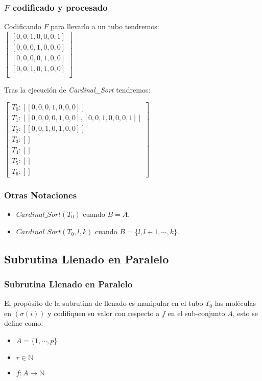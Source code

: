 \documentclass[12pt]{beamer}
\begin{document}
 \begin{frame}
     \frametitle{$F$ codificado y procesado}
     Codificando $F$ para llevarlo a un tubo tendremos: \\
    $
        \begin{bmatrix}
            [0, 0, 1, 0, 0, 0, 1] \\
            [0, 0, 0, 1, 0, 0, 0] \\
            [0, 0, 0, 0, 1, 0, 0] \\
            [0, 0, 1, 0, 1, 0, 0] \\
        \end{bmatrix}
    $
    \par Tras la ejecución de \emph{Cardinal\_Sort} tendremos: \\
    \begin{flushleft}
    $
    \left[
        \begin{array}{l}
            T_0: [[0, 0, 0, 1, 0, 0, 0]] \\
            T_1: [[0, 0, 0, 0, 1, 0, 0], [0, 0, 1, 0, 0, 0, 1]] \\
            T_2: [[0, 0, 1, 0, 1, 0, 0]] \\
            T_3: [] \\
            T_4: [] \\
            T_5: [] \\
            T_6: [] 
        \end{array}
    \right]
    $
    \end{flushleft}
 \end{frame}
 \begin{frame}
     \frametitle{Otras Notaciones}
     \begin{itemize}
        \item $Cardinal\_Sort(T_0)$ cuando $B=A$.
        \item $Cardinal\_Sort(T_0, l, k)$ cuando $B=\{l, l+1,\cdots,k\}$.
    \end{itemize}
 \end{frame}
 \begin{frame}
     \subsection{Subrutina Llenado en Paralelo}
     \frametitle{Subrutina Llenado en Paralelo}
     El propósito de la subrutina de llenado es manipular en el tubo $T_0$ las moléculas en $(\sigma(i))$ y codifiquen su valor con respecto a $f$ en el sub-conjunto $A$, esto se define como:
   \begin{itemize}
       \item $A=\{1,\cdots,p\}$
       \item $r \in \mathbb{N}$
       \item $f:A\rightarrow\mathbb{N}$
   \end{itemize} 
 \end{frame}
\end{document}
